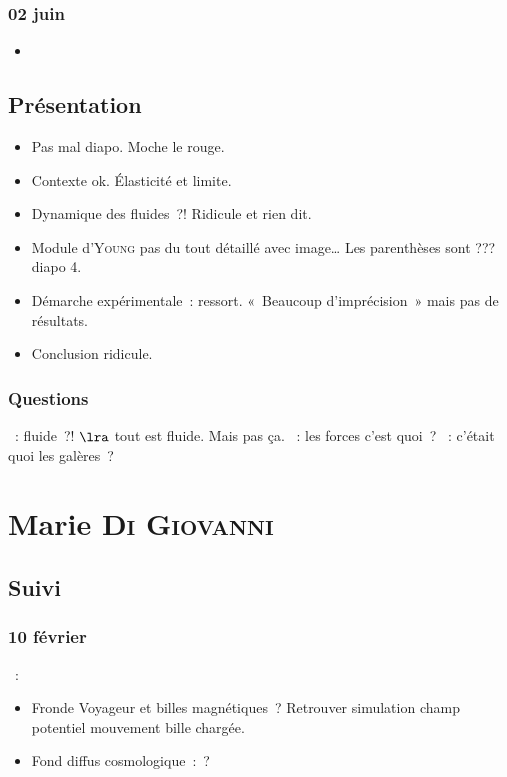 \documentclass[a4paper, 11pt, final, garamond]{book}
\begin{document}
\subsection{02 juin}
\begin{itemize}
  \item 
\end{itemize}

\section{Présentation}

\begin{itemize}
  \item Pas mal diapo. Moche le rouge.
  \item Contexte ok. Élasticité et limite.
  \item Dynamique des fluides~?! Ridicule et rien dit.
  \item Module d'\textsc{Young} pas du tout détaillé avec image… Les parenthèses
    sont ??? diapo 4.
  \item Démarche expérimentale~: ressort. «~Beaucoup d'imprécision~» mais pas de
    résultats.
  \item Conclusion ridicule.
\end{itemize}

\subsection{Questions}
\begin{itemize}
  ~: fluide~?!
    $\lra$ tout est fluide. Mais pas ça.
  ~: les forces c'est quoi~?
  ~: c'était quoi les galères~?
\end{itemize}

\chapter{Marie \textsc{Di Giovanni}}
\label{ch:marie}
\section{Suivi}
\subsection{10 février}
\begin{itemize}
    ~:
        \begin{itemize}
            \item Fronde Voyageur et billes magnétiques~? Retrouver simulation
                champ potentiel mouvement bille chargée.
            \item Fond diffus cosmologique~:~?
        \end{itemize}
\end{itemize}
\end{document}
